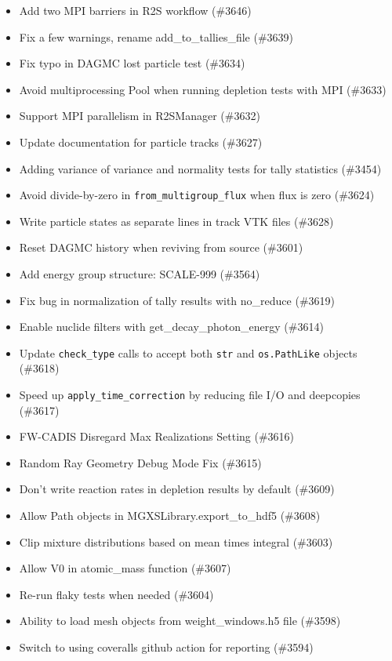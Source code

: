 \begin{itemize}
\item Add two MPI barriers in R2S workflow (\#3646)
\item Fix a few warnings, rename add\_to\_tallies\_file (\#3639)
\item Fix typo in DAGMC lost particle test (\#3634)
\item Avoid multiprocessing Pool when running depletion tests with MPI (\#3633)
\item Support MPI parallelism in R2SManager (\#3632)
\item Update documentation for particle tracks (\#3627)
\item Adding variance of variance and normality tests for tally statistics (\#3454)
\item Avoid divide-by-zero in \texttt{from\_multigroup\_flux} when flux is zero (\#3624)
\item Write particle states as separate lines in track VTK files (\#3628)
\item Reset DAGMC history when reviving from source (\#3601)
\item Add energy group structure: SCALE-999 (\#3564)
\item Fix bug in normalization of tally results with no\_reduce (\#3619)
\item Enable nuclide filters with get\_decay\_photon\_energy (\#3614)
\item Update \texttt{check\_type} calls to accept both \texttt{str} and \texttt{os.PathLike} objects (\#3618)
\item Speed up \texttt{apply\_time\_correction} by reducing file I/O and deepcopies (\#3617)
\item FW-CADIS Disregard Max Realizations Setting (\#3616)
\item Random Ray Geometry Debug Mode Fix (\#3615)
\item Don't write reaction rates in depletion results by default (\#3609)
\item Allow Path objects in MGXSLibrary.export\_to\_hdf5 (\#3608)
\item Clip mixture distributions based on mean times integral (\#3603)
\item Allow V0 in atomic\_mass function (\#3607)
\item Re-run flaky tests when needed (\#3604)
\item Ability to load mesh objects from weight\_windows.h5 file (\#3598)
\item Switch to using coveralls github action for reporting (\#3594)

\end{itemize}
